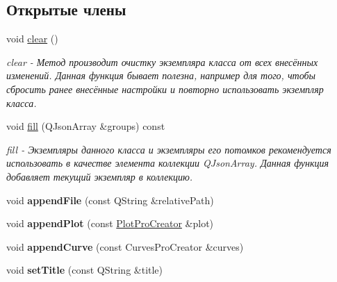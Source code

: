 \subsection*{Открытые члены}
\begin{DoxyCompactItemize}
\item 
\hypertarget{classGroupProCreator_ac4f041a6f33e3e82ade28155617a7336}{void \hyperlink{classGroupProCreator_ac4f041a6f33e3e82ade28155617a7336}{clear} ()}\label{classGroupProCreator_ac4f041a6f33e3e82ade28155617a7336}

\begin{DoxyCompactList}\small\item\em clear -\/ Метод производит очистку экземпляра класса от всех внесённых изменений. Данная функция бывает полезна, например для того, чтобы сбросить ранее внесённые настройки и повторно использовать экземпляр класса. \end{DoxyCompactList}\item 
void \hyperlink{classGroupProCreator_add3e03e3b53e95959d1ed67092263dd7}{fill} (\-Q\-Json\-Array \&groups) const 
\begin{DoxyCompactList}\small\item\em fill -\/ Экземпляры данного класса и экземпляры его потомков рекомендуется использовать в качестве элемента коллекции \-Q\-Json\-Array. Данная функция добавляет текущий экземпляр в коллекцию. \end{DoxyCompactList}\item 
\hypertarget{classGroupProCreator_ae1766bbc8308f331d259383b90fac3c8}{void {\bfseries append\-File} (const \-Q\-String \&relative\-Path)}\label{classGroupProCreator_ae1766bbc8308f331d259383b90fac3c8}

\item 
\hypertarget{classGroupProCreator_acc072473508e5067f3173e1d0a1bd513}{void {\bfseries append\-Plot} (const \hyperlink{classPlotProCreator}{\-Plot\-Pro\-Creator} \&plot)}\label{classGroupProCreator_acc072473508e5067f3173e1d0a1bd513}

\item 
\hypertarget{classGroupProCreator_ab4bb6ed9b2f70bb8f9285f547d533fe5}{void {\bfseries append\-Curve} (const \-Curves\-Pro\-Creator \&curves)}\label{classGroupProCreator_ab4bb6ed9b2f70bb8f9285f547d533fe5}

\item 
\hypertarget{classGroupProCreator_a8527f79180870b91107bd3837b2fdc95}{void {\bfseries set\-Title} (const \-Q\-String \&title)}\label{classGroupProCreator_a8527f79180870b91107bd3837b2fdc95}

\end{DoxyCompactItemize}
